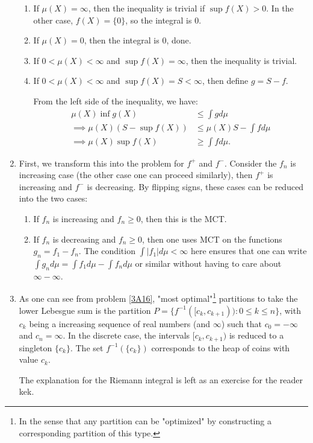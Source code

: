 \begin{enumerate}[label=\textbf{3A.\arabic*}]
    \begin{enumerate}[label=(\alph*)]
    \item
      If \( \mu (X) = \infty \), then the inequality is trivial if \( \sup f(X)
      > 0\). In the other case, \( f(X) = \{0\}   \), so the integral is \( 0
      \).
    \item If \( \mu (X) = 0 \), then the integral is \( 0 \), done.
    \item If \( 0< \mu (X) < \infty \) and \( \sup f(X) = \infty \), then the
      inequality is trivial.
    \item If \( 0 < \mu(X) < \infty \) and \( \sup f(X) = S < \infty \), then
      define \( g = S - f \).

      From the left side of the inequality, we have:
      \begin{align*}
        \mu (X) \inf g(X) &\le \int gd\mu\\
        \implies \mu (X) (S - \sup f(X)) &\le \mu (X)S - \int fd\mu \\
        \implies \mu (X) \sup f(X) &\ge \int fd\mu 
      .\end{align*}
    \end{enumerate}
  \item First, we transform this into the problem for \( f^{+} \) and \( f^{-}
    \). Consider the \( f_{n} \) is increasing case (the other case one can
    proceed similarly), then \( f^{+} \) is increasing and \( f^{-} \) is
    decreasing. By flipping signs, these cases can be reduced into the two cases:
    \begin{enumerate}[label=\alph*]
      \item If \( f_{n}  \) is increasing and \( f_{n} \ge 0 \), then this is
        the MCT.
      \item If \( f_{n} \) is decreasing and \( f_{n} \ge 0 \), then one uses
        MCT on the functions \( g_{n} = f_{1} - f_{n} \). The condition \( \int
        |f_{1}| d\mu  < \infty\) here ensures that one can write \( \int
        g_{n}d\mu  = \int f_{1}d\mu  - \int f_{n}d\mu  \) or similar without
        having to care about \( \infty - \infty \).
    \end{enumerate}
  \item As one can see from problem \ref{3A16}, "most optimal"\footnote{In the
    sense that any partition can be "optimized" by constructing a
    corresponding partition of this type.} partitions to take
    the lower Lebesgue sum is the partition \( P = \{f^{-1}([c_{k}, c_{k + 1})):
    0 \le k \le n\}   \), with \( c_{k} \) being a increasing sequence of real
    numbers (and \( \infty \)) such that \( c_{0} = -\infty \) and \( c_{n} =
    \infty \). In the discrete case, the intervals \( [c_{k}, c_{k + 1}) \)
    is reduced to a singleton \( \{c_{k}\}   \). The set \( f^{-1}(\{c_{k}\}  )
    \) corresponds to the heap of coins with value \( c_{k} \).

    The explanation for the Riemann integral is left as an exercise for the
    reader kek.
\end{enumerate}

